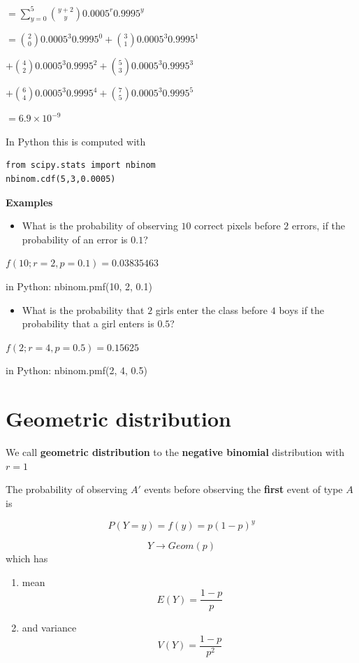 \documentclass[
]{book}
\providecommand{\tightlist}{%
  \setlength{\itemsep}{0pt}\setlength{\parskip}{0pt}}
\begin{document}
\(=\sum_{y=0}^5\binom {y+2} y 0.0005^r0.9995^y\)

\(=\binom {2} 0 0.0005^3 0.9995^0 +\binom {3} 1 0.0005^3 0.9995^1\)

\(+\binom {4} 2 0.0005^3 0.9995^2 +\binom {5} 3 0.0005^3 0.9995^3\)

\(+\binom {6} 4 0.0005^3 0.9995^4 +\binom {7} 5 0.0005^3 0.9995^5\)

\(= 6.9\times 10^{-9}\)

In Python this is computed with

\begin{verbatim}
from scipy.stats import nbinom
nbinom.cdf(5,3,0.0005)
\end{verbatim}

\textbf{Examples}

\begin{itemize}
\tightlist
\item
  What is the probability of observing \(10\) correct pixels before \(2\) errors, if the probability of an error is \(0.1\)?
\end{itemize}

\(f(10; r=2, p=0.1)=0.03835463\)

in Python: nbinom.pmf(10, 2, 0.1)

\begin{itemize}
\tightlist
\item
  What is the probability that \(2\) girls enter the class before \(4\) boys if the probability that a girl enters is \(0.5\)?
\end{itemize}

\(f(2; r=4, p=0.5)=0.15625\)

in Python: nbinom.pmf(2, 4, 0.5)

\hypertarget{geometric-distribution}{%
\section{Geometric distribution}\label{geometric-distribution}}

We call \textbf{geometric distribution} to the \textbf{negative binomial} distribution with \(r=1\)

The probability of observing \(A'\) events before observing the \textbf{first} event of type \(A\) is

\[P(Y=y)=f(y)= p(1-p)^y\]

\[Y\rightarrow Geom(p)\]
which has

\begin{enumerate}
\def\labelenumi{\arabic{enumi})}
\item
  mean \[E(Y)= \frac{1-p}{p}\]
\item
  and variance \[V(Y)= \frac{1-p}{p^2}\]
\end{enumerate}
\end{document}
